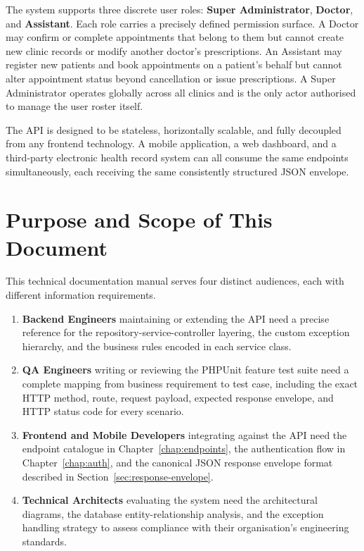 The system supports three discrete user roles: \textbf{Super Administrator},
\textbf{Doctor}, and \textbf{Assistant}. Each role carries a precisely
defined permission surface. A Doctor may confirm or complete appointments
that belong to them but cannot create new clinic records or modify another
doctor's prescriptions. An Assistant may register new patients and book
appointments on a patient's behalf but cannot alter appointment status
beyond cancellation or issue prescriptions. A Super Administrator operates
globally across all clinics and is the only actor authorised to manage
the user roster itself.

The API is designed to be stateless, horizontally scalable, and fully
decoupled from any frontend technology. A mobile application, a web
dashboard, and a third-party electronic health record system can all
consume the same endpoints simultaneously, each receiving the same
consistently structured JSON envelope.

\section{Purpose and Scope of This Document}

This technical documentation manual serves four distinct audiences, each
with different information requirements.

\begin{enumerate}
  \item \textbf{Backend Engineers} maintaining or extending the API need a
    precise reference for the repository-service-controller layering, the
    custom exception hierarchy, and the business rules encoded in each
    service class.

  \item \textbf{QA Engineers} writing or reviewing the PHPUnit feature test
    suite need a complete mapping from business requirement to test case,
    including the exact HTTP method, route, request payload, expected
    response envelope, and HTTP status code for every scenario.

  \item \textbf{Frontend and Mobile Developers} integrating against the API
    need the endpoint catalogue in Chapter~\ref{chap:endpoints}, the
    authentication flow in Chapter~\ref{chap:auth}, and the canonical JSON
    response envelope format described in Section~\ref{sec:response-envelope}.

  \item \textbf{Technical Architects} evaluating the system need the
    architectural diagrams, the database entity-relationship analysis, and
    the exception handling strategy to assess compliance with their
    organisation's engineering standards.
\end{enumerate}

